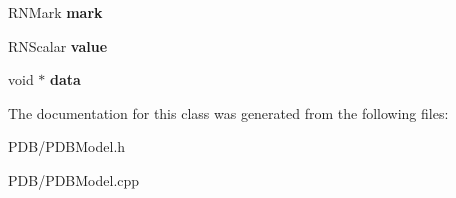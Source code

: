 \begin{DoxyCompactItemize}
\item 
R\+N\+Mark {\bfseries mark}\hypertarget{class_p_d_b_model_a7f90ad17e40baa855d6722d6fb09b4d2}{}\label{class_p_d_b_model_a7f90ad17e40baa855d6722d6fb09b4d2}

\item 
R\+N\+Scalar {\bfseries value}\hypertarget{class_p_d_b_model_a602a9f0bf0e91cb350c7dfe902dd8ed5}{}\label{class_p_d_b_model_a602a9f0bf0e91cb350c7dfe902dd8ed5}

\item 
void $\ast$ {\bfseries data}\hypertarget{class_p_d_b_model_a749e55818d75dcf2caabb79c55151779}{}\label{class_p_d_b_model_a749e55818d75dcf2caabb79c55151779}

\end{DoxyCompactItemize}


The documentation for this class was generated from the following files\+:\begin{DoxyCompactItemize}
\item 
P\+D\+B/P\+D\+B\+Model.\+h\item 
P\+D\+B/P\+D\+B\+Model.\+cpp\end{DoxyCompactItemize}
